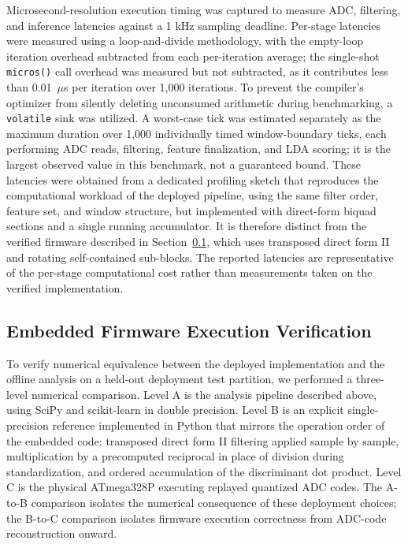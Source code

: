 \documentclass[preprint,12pt]{elsarticle}
\begin{document}
Microsecond-resolution execution timing was captured to measure ADC, filtering, and inference latencies against a 1 kHz sampling deadline. Per-stage latencies were measured using a loop-and-divide methodology, with the empty-loop iteration overhead subtracted from each per-iteration average; the single-shot \texttt{micros()} call overhead was measured but not subtracted, as it contributes less than 0.01~$\mu$s per iteration over 1,000 iterations. To prevent the compiler's optimizer from silently deleting unconsumed arithmetic during benchmarking, a \texttt{volatile} sink was utilized. A worst-case tick was estimated separately as the maximum duration over 1,000 individually timed window-boundary ticks, each performing ADC reads, filtering, feature finalization, and LDA scoring; it is the largest observed value in this benchmark, not a guaranteed bound. These latencies were obtained from a dedicated profiling sketch that reproduces the computational workload of the deployed pipeline, using the same filter order, feature set, and window structure, but implemented with direct-form biquad sections and a single running accumulator. It is therefore distinct from the verified firmware described in Section~\ref{sec:embedded_verification}, which uses transposed direct form II and rotating self-contained sub-blocks. The reported latencies are representative of the per-stage computational cost rather than measurements taken on the verified implementation.

\subsection{Embedded Firmware Execution Verification} \label{sec:embedded_verification}
To verify numerical equivalence between the deployed implementation and the offline analysis on a held-out deployment test partition, we performed a three-level numerical comparison. Level A is the analysis pipeline described above, using SciPy and scikit-learn in double precision. Level B is an explicit single-precision reference implemented in Python that mirrors the operation order of the embedded code: transposed direct form II filtering applied sample by sample, multiplication by a precomputed reciprocal in place of division during standardization, and ordered accumulation of the discriminant dot product. Level C is the physical ATmega328P executing replayed quantized ADC codes. The A-to-B comparison isolates the numerical consequence of these deployment choices; the B-to-C comparison isolates firmware execution correctness from ADC-code reconstruction onward.
\end{document}
